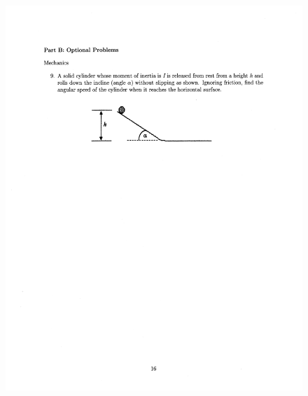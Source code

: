 \documentclass[10pt,a4paper]{article}
\begin{document}
\begin{figure}[H]
 \centering
 \includegraphics[width=16cm]{pdf/1-1T38.png}
\end{figure}
 \newpage
\end{document}
